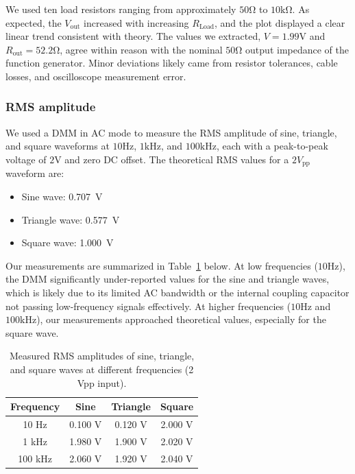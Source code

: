 \documentclass{article}
\begin{document}
\noindent We used ten load resistors ranging from approximately $50\si{\ohm}$
to $10\si{\kilo\ohm}$. As expected, the $V_\text{out}$ increased with increasing
$R_\text{Load}$, and the plot displayed a clear linear trend consistent with 
theory. The values we extracted, $V=1.99\si{\volt}$ and $R_\text{out}=52.2\si{\ohm}$,
agree within reason with the nominal $50\si{\ohm}$ output impedance of the
function generator. Minor deviations likely came from resistor tolerances, 
cable losses, and oscilloscope measurement error.


\subsubsection{RMS amplitude}

We used a DMM in AC mode to measure the RMS amplitude of sine, triangle, and
square waveforms at $10\si{\hertz}$, $1\si{\kilo\hertz}$, and $100\si{\kilo\hertz}$,
each with a peak-to-peak voltage of $2\si{\volt}$ and zero DC offset. The theoretical
RMS values for a $2V_\text{pp}$ waveform are:

\begin{itemize}
    \item Sine wave: \SI{0.707}{\volt}
    \item Triangle wave: \SI{0.577}{\volt}
    \item Square wave: \SI{1.000}{\volt}
\end{itemize}

\noindent Our measurements are summarized in Table~\ref{tab:rms_measurements} below. At low
frequencies ($10\si{\hertz}$), the DMM significantly under-reported values for
the sine and triangle waves, which is likely due to its limited AC bandwidth
or the internal coupling capacitor not passing low-frequency signals effectively.
At higher frequencies ($10\si{\hertz}$ and $100\si{\kilo\hertz}$), our
measurements approached theoretical values, especially for the square wave.

\begin{table}[H]
    \centering
    \begin{tabular}{ | c c c c | }
        \hline
        Frequency & Sine & Triangle & Square \\
        \hline
        10 Hz   & 0.100 V & 0.120 V & 2.000 V \\
        1 kHz   & 1.980 V & 1.900 V & 2.020 V \\
        100 kHz & 2.060 V & 1.920 V & 2.040 V \\
        \hline
    \end{tabular}
    \caption{Measured RMS amplitudes of sine, triangle, and square waves at different frequencies (2 Vpp input).}
    \label{tab:rms_measurements}
\end{table}
\end{document}
